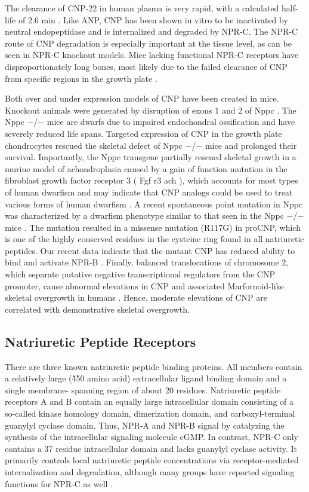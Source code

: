 \documentclass[14pt,a4paper,onecolumn]{article}
\begin{document}
The clearance of CNP-22 in human plasma is very rapid, with a calculated half-life of 2.6 min \citep{Hunt1994}. Like ANP, CNP has been shown in vitro to be inactivated by neutral endopeptidase \citep{Kenny1993} and is internalized and degraded by NPR-C. The NPR-C route of CNP degradation is especially important at the tissue level, as can be seen in NPR-C knockout models. Mice lacking functional NPR-C receptors have disproportionately long bones, most likely due to the failed clearance of CNP from specific regions in the growth plate \citep{Jaubert1999} \citep{Matsukawa1999}.

Both over and under expression models of CNP have been created in mice. Knockout animals were generated by disruption of exons 1 and 2 of Nppc \citep{Chusho2001}. The Nppc −/− mice are dwarfs due to impaired endochondral ossification and have severely reduced life spans. Targeted expression of CNP in the growth plate chondrocytes rescued the skeletal defect of Nppc −/− mice and prolonged their survival. Importantly, the Nppc transgene partially rescued skeletal growth in a murine model of achondroplasia caused by a gain of function mutation in the fibroblast growth factor receptor 3 ( Fgf r3 ach ), which accounts for most types of human dwarfism and may indicate that CNP analogs could be used to treat various forms of human dwarfism \citep{Yasoda2004}. A recent spontaneous point mutation in Nppc was characterized by a dwarfism phenotype similar to that seen in the Nppc −/− mice \citep{Jiao2007}. The mutation resulted in a missense mutation (R117G) in proCNP, which is one of the highly conserved residues in the cysteine ring found in all natriuretic peptides. Our recent data indicate that the mutant CNP has reduced ability to bind and activate NPR-B \citep{Yoder2008}. Finally, balanced translocations of chromosome 2, which separate putative negative transcriptional regulators from the CNP promoter, cause abnormal elevations in CNP and associated Marfornoid-like skeletal overgrowth in humans \citep{Bocciardi2007} \citep{Moncla2007}. Hence, moderate elevations of CNP are correlated with demonstrative skeletal overgrowth.

\subsection{Natriuretic Peptide Receptors}
There are three known natriuretic peptide binding proteins. All members contain a relatively large (\~450 amino acid) extracellular ligand binding domain and a single membrane- spanning region of about 20 residues. Natriuretic peptide receptors A and B contain an equally large intracellular domain consisting of a so-called kinase homology domain, dimerization domain, and carboxyl-terminal guanylyl cyclase domain. Thus, NPR-A and NPR-B signal by catalyzing the synthesis of the intracellular signaling molecule cGMP. In contrast, NPR-C only contains a 37 residue intracellular domain and lacks guanylyl cyclase activity. It primarily controls local natriuretic peptide concentrations via receptor-mediated internalization and degradation, although many groups have reported signaling functions for NPR-C as well \citep{Rose2008}.
\end{document}
